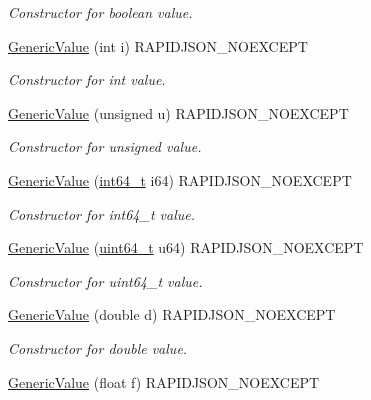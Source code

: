 \begin{DoxyCompactItemize}
\begin{DoxyCompactList}\small\item\em Constructor for boolean value. \end{DoxyCompactList}\item 
\mbox{\hyperlink{classrapidjson_1_1_generic_value_abba0c9ccfd90726f916c36013a2e9e19}{Generic\+Value}} (int i) R\+A\+P\+I\+D\+J\+S\+O\+N\+\_\+\+N\+O\+E\+X\+C\+E\+PT
\begin{DoxyCompactList}\small\item\em Constructor for int value. \end{DoxyCompactList}\item 
\mbox{\hyperlink{classrapidjson_1_1_generic_value_a4a8060a42b7953a2981ad892180ca5a6}{Generic\+Value}} (unsigned u) R\+A\+P\+I\+D\+J\+S\+O\+N\+\_\+\+N\+O\+E\+X\+C\+E\+PT
\begin{DoxyCompactList}\small\item\em Constructor for unsigned value. \end{DoxyCompactList}\item 
\mbox{\hyperlink{classrapidjson_1_1_generic_value_acd4ae9a8dba4498d1d7cce6667529bb8}{Generic\+Value}} (\mbox{\hyperlink{stdint_8h_a414156feea104f8f75b4ed9e3121b2f6}{int64\+\_\+t}} i64) R\+A\+P\+I\+D\+J\+S\+O\+N\+\_\+\+N\+O\+E\+X\+C\+E\+PT
\begin{DoxyCompactList}\small\item\em Constructor for int64\+\_\+t value. \end{DoxyCompactList}\item 
\mbox{\hyperlink{classrapidjson_1_1_generic_value_a1f125e735577aae64c0306345de45563}{Generic\+Value}} (\mbox{\hyperlink{stdint_8h_aec6fcb673ff035718c238c8c9d544c47}{uint64\+\_\+t}} u64) R\+A\+P\+I\+D\+J\+S\+O\+N\+\_\+\+N\+O\+E\+X\+C\+E\+PT
\begin{DoxyCompactList}\small\item\em Constructor for uint64\+\_\+t value. \end{DoxyCompactList}\item 
\mbox{\hyperlink{classrapidjson_1_1_generic_value_a71b9e2ec1f7bf9e2f034126ca7b4945a}{Generic\+Value}} (double d) R\+A\+P\+I\+D\+J\+S\+O\+N\+\_\+\+N\+O\+E\+X\+C\+E\+PT
\begin{DoxyCompactList}\small\item\em Constructor for double value. \end{DoxyCompactList}\item 
\mbox{\hyperlink{classrapidjson_1_1_generic_value_afe94e5e86a5b1a3fb605a9f8422f048b}{Generic\+Value}} (float f) R\+A\+P\+I\+D\+J\+S\+O\+N\+\_\+\+N\+O\+E\+X\+C\+E\+PT

\end{DoxyCompactItemize}
